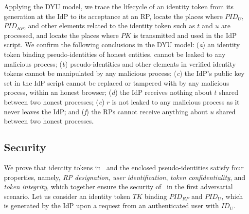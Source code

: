 Applying the DYU model, we trace the lifecycle of an identity token from its generation at the IdP to its acceptance at an RP, locate the places where $PID_U$, $PID_{RP}$, and other elements related to the identity token such as $t$ and $u$ are processed, and locate the places where $PK$ is transmitted and used in the IdP script.
We confirm the following conclusions in the DYU model:
 (\emph{a}) an identity token binding pseudo-identities of honest entities, cannot be leaked to any malicious process;
 (\emph{b}) pseudo-identities and other elements in verified identity tokens cannot be manipulated by any malicious process;
    (\emph{c}) the IdP's public key set in the IdP script cannot be replaced or tampered with by any malicious process, within an honest browser;
 (\emph{d}) the IdP receives nothing about $t$ shared between two honest processes;
 (\emph{e}) $r$ is not leaked to any malicious process as it never leaves the IdP;
and (\emph{f}) the RPs cannot receive anything about $u$ shared between two honest processes.



\subsection{Security}
\label{analysis-security}


We prove that identity tokens in \usso~and the enclosed pseudo-identities satisfy four properties, namely, \emph{RP designation}, \emph{user identification}, \emph{token confidentiality}, and \emph{token integrity}, which together ensure the security of \usso~in the first adversarial scenario.
Let us consider an identity token $TK$ binding $PID_{RP}$ and $PID_U$, which is generated by the IdP upon a request from an authenticated user with $ID_U$.


